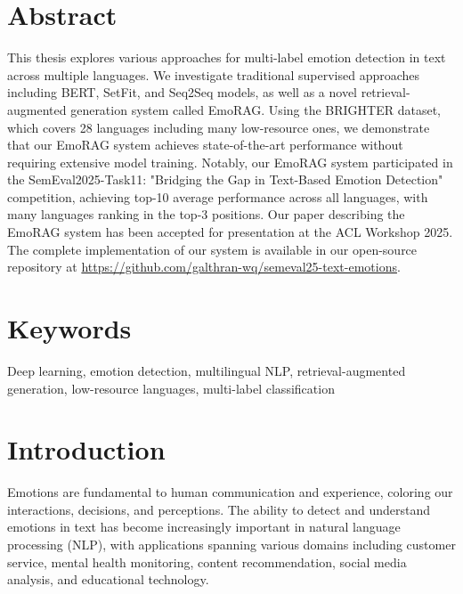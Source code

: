\documentclass[a4paper,12pt]{extarticle}
\begin{document}
\newpage
\setcounter{page}{2}

{
	\hypersetup{linkcolor=black}
	\tableofcontents
}

\newpage

\section*{Abstract}

This thesis explores various approaches for multi-label emotion detection in text across multiple languages. 
We investigate traditional supervised approaches including BERT, SetFit, and Seq2Seq models, as well as a novel retrieval-augmented generation system called EmoRAG. 
Using the BRIGHTER dataset, which covers 28 languages including many low-resource ones, we demonstrate that our EmoRAG system achieves state-of-the-art performance without requiring extensive model training. 
Notably, our EmoRAG system participated in the SemEval2025-Task11: "Bridging the Gap in Text-Based Emotion Detection" competition, achieving top-10 average performance across all languages, with many languages ranking in the top-3 positions. 
Our paper describing the EmoRAG system has been accepted for presentation at the ACL Workshop 2025. The complete implementation of our system is available in our open-source repository at \url{https://github.com/galthran-wq/semeval25-text-emotions}.


\section*{Keywords}
Deep learning, emotion detection, multilingual NLP, retrieval-augmented generation, low-resource languages, multi-label classification

\section{Introduction}

Emotions are fundamental to human communication and experience, coloring our interactions, decisions, and perceptions. The ability to detect and understand emotions in text has become increasingly important in natural language processing (NLP), with applications spanning various domains including customer service, mental health monitoring, content recommendation, social media analysis, and educational technology.
\end{document}
